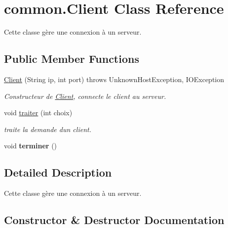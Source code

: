 \hypertarget{classcommon_1_1Client}{}\section{common.\+Client Class Reference}
\label{classcommon_1_1Client}


Cette classe gère une connexion à un serveur.  


\subsection*{Public Member Functions}
\begin{DoxyCompactItemize}
\item 
\hyperlink{classcommon_1_1Client_a9194e0865691059824d870b32731ece3}{Client} (String ip, int port)  throws Unknown\+Host\+Exception, I\+O\+Exception 
\begin{DoxyCompactList}\small\item\em Constructeur de \hyperlink{classcommon_1_1Client}{Client}, connecte le client au serveur. \end{DoxyCompactList}\item 
void \hyperlink{classcommon_1_1Client_a9e906ef13cae3b0be8c8899c2005d0d6}{traiter} (int choix)
\begin{DoxyCompactList}\small\item\em traite la demande d\textquotesingle{}un client. \end{DoxyCompactList}\item 
\mbox{\label{classcommon_1_1Client_a1ca2b60d665eaa407e95f22633b58c59}} 
void {\bfseries terminer} ()
\end{DoxyCompactItemize}


\subsection{Detailed Description}
Cette classe gère une connexion à un serveur. 

\subsection{Constructor \& Destructor Documentation}
\mbox{\label{classcommon_1_1Client_a9194e0865691059824d870b32731ece3}} 

